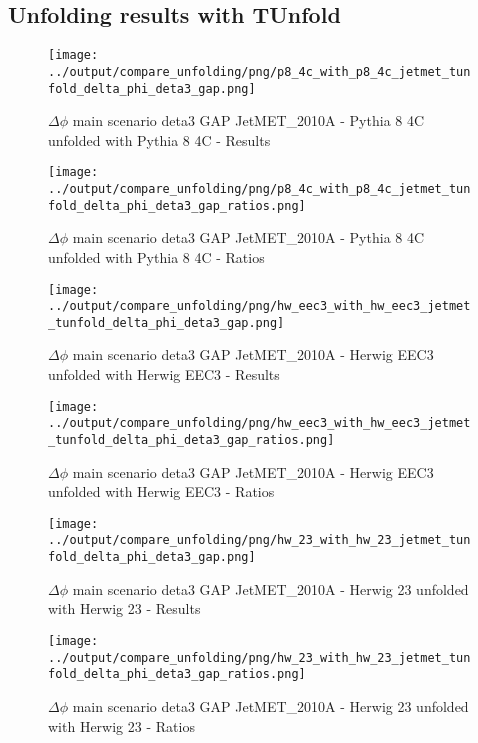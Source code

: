 \documentclass[11pt]{book}
\begin{document}
\clearpage
\subsection{Unfolding results with TUnfold}

\begin{figure}[ht]
\centering
\texttt{[image: ../output/compare\_unfolding/png/p8\_4c\_with\_p8\_4c\_jetmet\_tunfold\_delta\_phi\_deta3\_gap.png]}
\caption{$\Delta\phi$ main scenario deta3 GAP JetMET\_2010A - Pythia 8 4C unfolded with Pythia 8 4C - Results}
\label{p8_p8_jetmet_tunfold_delta_phi_deta3_gap_a}
\end{figure}

\begin{figure}[ht]
\centering
\texttt{[image: ../output/compare\_unfolding/png/p8\_4c\_with\_p8\_4c\_jetmet\_tunfold\_delta\_phi\_deta3\_gap\_ratios.png]}
\caption{$\Delta\phi$ main scenario deta3 GAP JetMET\_2010A - Pythia 8 4C unfolded with Pythia 8 4C - Ratios}
\label{p8_p8_jetmet_tunfold_delta_phi_deta3_gap_b}
\end{figure}

\begin{figure}[ht]
\centering
\texttt{[image: ../output/compare\_unfolding/png/hw\_eec3\_with\_hw\_eec3\_jetmet\_tunfold\_delta\_phi\_deta3\_gap.png]}
\caption{$\Delta\phi$ main scenario deta3 GAP JetMET\_2010A - Herwig EEC3 unfolded with Herwig EEC3 - Results}
\label{hw_eec3_hw_eec3_jetmet_tunfold_delta_phi_deta3_gap_a}
\end{figure}

\begin{figure}[ht]
\centering
\texttt{[image: ../output/compare\_unfolding/png/hw\_eec3\_with\_hw\_eec3\_jetmet\_tunfold\_delta\_phi\_deta3\_gap\_ratios.png]}
\caption{$\Delta\phi$ main scenario deta3 GAP JetMET\_2010A - Herwig EEC3 unfolded with Herwig EEC3 - Ratios}
\label{hw_eec3_hw_eec3_jetmet_tunfold_delta_phi_deta3_gap_b}
\end{figure}

\begin{figure}[ht]
\centering
\texttt{[image: ../output/compare\_unfolding/png/hw\_23\_with\_hw\_23\_jetmet\_tunfold\_delta\_phi\_deta3\_gap.png]}
\caption{$\Delta\phi$ main scenario deta3 GAP JetMET\_2010A - Herwig 23 unfolded with Herwig 23 - Results}
\label{hw_23_hw_23_jetmet_tunfold_delta_phi_deta3_gap_a}
\end{figure}

\begin{figure}[ht]
\centering
\texttt{[image: ../output/compare\_unfolding/png/hw\_23\_with\_hw\_23\_jetmet\_tunfold\_delta\_phi\_deta3\_gap\_ratios.png]}
\caption{$\Delta\phi$ main scenario deta3 GAP JetMET\_2010A - Herwig 23 unfolded with Herwig 23 - Ratios}
\label{hw_23_hw_23_jetmet_tunfold_delta_phi_deta3_gap_b}
\end{figure}
\end{document}
